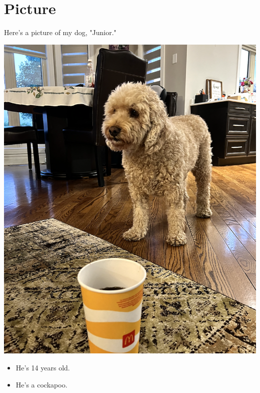 \documentclass{article}
\begin{document}
\section{Picture}
Here's a picture of my dog, "Junior."
\begin{center}
\includegraphics[scale=0.25]{junior.png}
\end{center}

\begin{itemize}
   \item He's 14 years old.
   \item He's a cockapoo.
\end{itemize}
\end{document}
